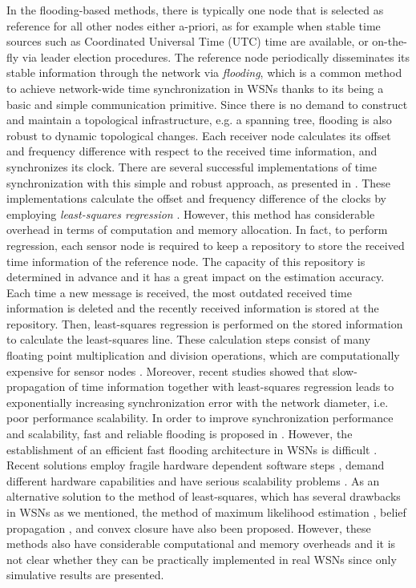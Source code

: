 \documentclass[english,a4paper,10pt,final]{article}
\numberwithin{equation}{section}
\numberwithin{figure}{section}
\begin{document}
In the flooding-based methods, there is typically one node that is selected as reference for all other nodes either a-priori, as for example when stable time sources such as Coordinated Universal Time (UTC) time are available, or on-the-fly via leader election procedures. The reference node periodically disseminates its stable information through the network via \emph{flooding}, which is a common method to achieve network-wide time synchronization in WSNs thanks to its being a basic and simple communication primitive. Since there is no demand to construct and maintain a topological infrastructure, e.g. a spanning tree, flooding is also robust to dynamic topological changes. Each receiver node calculates its offset and frequency difference with respect to the received time information, and synchronizes its clock. There are several successful implementations of time synchronization with this simple and robust approach, as presented in \cite{Maroti2004,RATS,Lenzen2009Optimal,Schmid:2010,Yildirim2013,Yildirim2013_2}. These implementations calculate the offset and frequency difference of the clocks by employing \emph{least-squares regression} \cite{Wu:10}. However, this method has considerable overhead in terms of computation and memory allocation. In fact, to perform regression, each sensor node is required to keep a repository to store the received time information of the reference node. The capacity of this repository is determined in advance and it has a great impact on the estimation accuracy. Each time a new message is received, the most outdated received time information is deleted and the recently received information is stored at the repository. Then, least-squares regression is performed on the stored information to calculate the least-squares line. These calculation steps consist of many floating point multiplication and division operations, which are computationally expensive for sensor nodes \cite{Yildirim2012}. Moreover, recent studies  \cite{Lenzen2009Optimal,Yildirim2013} showed that slow-propagation of time information together with least-squares regression leads to exponentially increasing synchronization error with the network diameter, i.e. poor performance scalability. In order to improve synchronization performance and scalability, fast and reliable flooding is proposed in \cite{Lenzen2009Optimal}. However, the establishment of an efficient fast flooding architecture in WSNs is difficult \cite{FlashFlooding2009}. Recent solutions employ fragile hardware dependent software steps \cite{ferrari2011efficient}, demand different hardware capabilities \cite{kuo2012reconfiguring} and have serious scalability problems \cite{wang2012exploiting,wang2012triggercast}. As an alternative solution to the method of least-squares, which has several drawbacks in WSNs as we mentioned, the method of maximum likelihood estimation \cite{Chaudhari:10,Leng:11,Cao:13}, belief propagation \cite{Leng:11b}, and convex closure \cite{Berthaud:00} have also been proposed. However, these methods also have considerable computational and memory overheads and it is not clear whether they can be practically implemented in real WSNs since only simulative results are presented.
\end{document}
